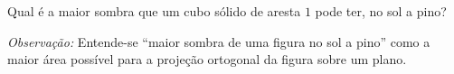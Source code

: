 Qual é a maior sombra que um cubo sólido de aresta $1$ pode ter, no sol a pino?

\textit{Observação:} Entende-se “maior sombra de uma figura no sol a pino” como a maior área possível para a projeção ortogonal da figura sobre um plano.